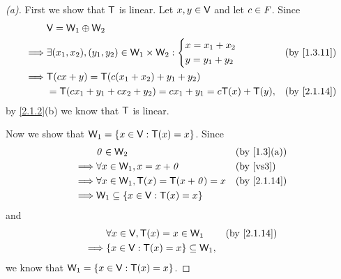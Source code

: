 \begin{proof}[(a)]
	First we show that \(\mathsf{T}\) is linear.
	Let \(x, y \in \mathsf{V}\) and let \(c \in \mathit{F}\).
	Since
	\begin{align*}
		         & \V = \W_1 \oplus \W_2                                                                 \\
		\implies & \exists (x_1, x_2), (y_1, y_2) \in \W_1 \times \W_2 : \begin{dcases}
			                                                                 x = x_1 + x_2 \\
			                                                                 y = y_1 + y_2
		                                                                 \end{dcases} &  & \by{1.3.11}   \\
		\implies & \T(cx + y) = \T(c (x_1 + x_2) + y_1 + y_2)                                            \\
		         & = \T(c x_1 + y_1 + c x_2 + y_2) = c x_1 + y_1 = c \T(x) + \T(y),     &  & \by{2.1.14}
	\end{align*}
	by \cref{2.1.2}(b) we know that \(\mathsf{T}\) is linear.

	Now we show that \(\mathsf{W}_1 = \left\lbrace x \in \mathsf{V} : \mathsf{T}(x) = x\right\rbrace\).
	Since
	\begin{align*}
		         & \zv \in \W_2                                &  & \by{1.3}[a]           \\
		\implies & \forall x \in \W_1, x = x + \zv             &  & \text{(by \ref{vs3})} \\
		\implies & \forall x \in \W_1, \T(x) = \T(x + \zv) = x &  & \by{2.1.14}           \\
		\implies & \W_1 \subseteq \set{x \in \V : \T(x) = x}
	\end{align*}
	and
	\begin{align*}
		         & \forall x \in \V, \T(x) = x \in \W_1       &  & \by{2.1.14} \\
		\implies & \set{x \in \V : \T(x) = x} \subseteq \W_1,
	\end{align*}
	we know that \(\mathsf{W}_1 = \left\lbrace x \in \mathsf{V} : \mathsf{T}(x) = x\right\rbrace\).
\end{proof}


